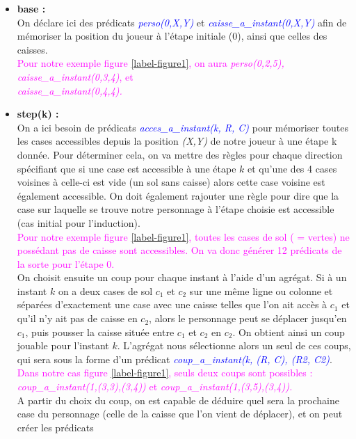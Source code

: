 \documentclass[12pt,a4paper]{article}
\begin{document}
\begin{itemize}
	\item \textbf{base :}\\
		On déclare ici des prédicats \emph{\textcolor{blue}{perso(0,X,Y)}} et \emph{\textcolor{blue}{caisse\_a\_instant(0,X,Y)}} afin de mémoriser la position du joueur à l'étape initiale (0), ainsi que celles des caisses.\\
		\textcolor{magenta}{Pour notre exemple figure \ref{label-figure1}, on aura \emph{perso(0,2,5), caisse\_a\_instant(0,3,4)}, et \\
		\emph{caisse\_a\_instant(0,4,4).}}\\
	\item \textbf{step(k) :}\\
		On a ici besoin de prédicats \emph{\textcolor{blue}{acces\_a\_instant(k, R, C)}} pour mémoriser toutes les cases accessibles depuis la position \emph{(X,Y)} de notre joueur à une étape k donnée. Pour déterminer 
		cela, on va mettre des règles pour chaque direction spécifiant que si une case est accessible à une étape $k$ et qu'une des 4 cases voisines à celle-ci est vide (un sol sans caisse) alors cette case voisine est 
		également accessible. On doit également rajouter une règle pour dire que la case sur laquelle se trouve notre personnage à l'étape choisie est accessible (cas initial pour l'induction).\\
		\textcolor{magenta}{Pour notre exemple figure \ref{label-figure1}, toutes les cases de sol ( = vertes) ne possédant pas de caisse sont accessibles. On va donc générer 12 prédicats de la sorte pour l'étape 0.}\\
		On choisit ensuite un coup pour chaque instant à l'aide d'un agrégat. Si à un instant $k$ on a deux cases de sol $c_1$ et $c_2$ sur une même ligne ou colonne et séparées d'exactement une case avec une caisse telles 
		que l'on ait accès à $c_1$ et qu'il n'y ait pas de caisse en $c_2$, alors le personnage peut se déplacer jusqu'en $c_1$, puis pousser la caisse située entre $c_1$ et $c_2$ en $c_2$. On obtient ainsi un coup jouable 
		pour l'instant $k$. L'agrégat nous sélectionne alors un seul de ces coups, qui sera sous la forme d'un prédicat \emph{\textcolor{blue}{coup\_a\_instant(k, (R, C), (R2, C2)}}.\\
		\textcolor{magenta}{Dans notre cas figure \ref{label-figure1}, seuls deux coups sont possibles : \emph{coup\_a\_instant(1,(3,3),(3,4))} et \emph{coup\_a\_instant(1,(3,5),(3,4)).}}\\
		A partir du choix du coup, on est capable de déduire quel sera la prochaine case du personnage (celle de la caisse que l'on vient de déplacer), et on peut créer les prédicats 

\end{itemize}
\end{document}
